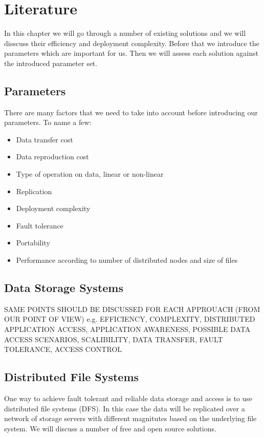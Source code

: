 \chapter{Literature}
\label{cha:literature}

In this chapter we will go through a number of existing solutions and we will 
disscuss their efficiency and deployment complexity. Before that we introduce the
parameters which are important for us. Then we will assess each solution against the
introduced parameter set.

\section{Parameters}
There are many factors that we need to take into account before introducing our parameters. To name a few:

\begin{itemize}
\item Data transfer cost
\item Data reproduction cost
\item Type of operation on data, linear or non-linear
\item Replication
\item Deployment complexity
\item Fault tolerance
\item Portability
\item Performance according to number of distributed nodes and size of files
\end{itemize}

\section{Data Storage Systems}
\label{sec:datastoragesystems}

SAME POINTS SHOULD BE DISCUSSED FOR EACH APPROUACH (FROM OUR POINT OF VIEW) 
e.g. EFFICIENCY, COMPLEXITY, DISTRIBUTED APPLICATION ACCESS, APPLICATION AWARENESS,
POSSIBLE DATA ACCESS SCENARIOS, SCALIBILITY, DATA TRANSFER, FAULT TOLERANCE, 
ACCESS CONTROL 


\section{Distributed File Systems}
One way to achieve fault tolerant and reliable data storage and access is to use
distributed file systems (DFS). In this case the data will be replicated over a
network of storage servers with different magnitutes based on the underlying file
system. We will discuss a number of free and open source solutions.

